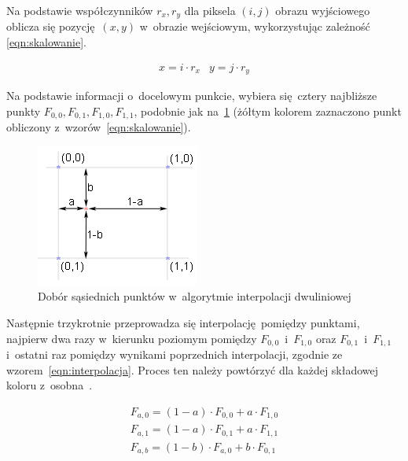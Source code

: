 Na podstawie współczynników $r_{x}, r_{y}$ dla piksela $(i, j)$ obrazu wyjściowego oblicza się pozycję~$(x, y)$ w~obrazie wejściowym, wykorzystując zależność \ref{eqn:skalowanie}.

\begin{equation}
    \label{eqn:skalowanie}
    \begin{array}{ll}
        x = i \cdot r_{x} & y = j \cdot r_{y}
    \end{array} 
\end{equation}

Na podstawie informacji o~docelowym punkcie, wybiera się cztery najbliższe punkty $F_{0,0}, F_{0,1}, F_{1,0}, F_{1,1}$, podobnie jak na~\ref{fig:bilinear-result} (żółtym kolorem zaznaczono punkt obliczony z~wzorów~\ref{eqn:skalowanie}). 

\begin{figure}[h]
    \centering
    \includegraphics[width=0.6\columnwidth]{figures/bi2.png}
    \caption{Dobór sąsiednich punktów w~algorytmie interpolacji dwuliniowej~\cite{algorytmy:bilinear}}
    \label{fig:bilinear-result}
\end{figure}

Następnie trzykrotnie przeprowadza się interpolację pomiędzy punktami, najpierw dwa razy w~kierunku poziomym pomiędzy $F_{0,0}$~i~$F_{1,0}$ oraz $F_{0,1}$~i~$F_{1,1}$ i~ostatni raz pomiędzy wynikami poprzednich interpolacji, zgodnie ze wzorem~\ref{eqn:interpolacja}.
Proces ten należy powtórzyć dla każdej składowej koloru z~osobna~\cite{algorytmy:bilinear}.

\begin{equation}
    \label{eqn:interpolacja}
    \begin{array}{l}
        F_{a,0} = (1-a) \cdot F_{0,0} + a \cdot F_{1,0} \\
        F_{a,1} = (1-a) \cdot F_{0,1} + a \cdot F_{1,1} \\
        F_{a,b} = (1-b) \cdot F_{a,0} + b \cdot F_{0,1} \\
    \end{array} 
\end{equation}

